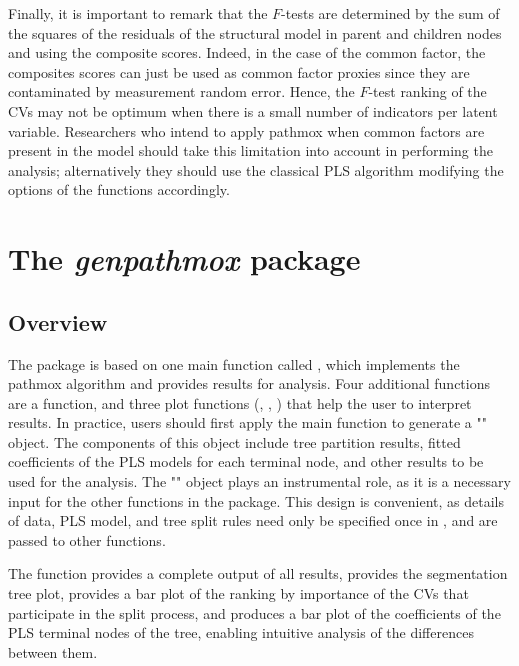 Finally, it is important to remark that the $F$-tests are determined by the sum of the squares of the residuals of the structural model in parent and children nodes and using the composite scores. Indeed, in the case of the common factor, the composites scores can just be used as common factor proxies since they are contaminated by measurement random error. Hence, the $F$-test ranking of the CVs may not be optimum when there is a small number of indicators per latent variable. Researchers who intend to apply pathmox when common factors are present in the model should take this limitation into account in performing the analysis; alternatively they should use the classical PLS algorithm modifying the options of the  functions accordingly.

\section{The \emph{genpathmox} package}

\subsection{Overview}

The  package is based on one main function called  , which implements the pathmox algorithm and provides results for analysis. Four additional functions are a   function, and three plot functions (,  ,  )  that help the user to interpret results. In practice, users should first apply the main function   to generate a  "" object.  The components of this object include tree partition results, fitted coefficients of the PLS models for each terminal node, and other results to be used for the analysis. The  "" object plays an instrumental role, as it is a necessary input for the other functions in the package. This design is convenient, as details of data, PLS model, and tree split rules need only be specified once in  , and are passed to other functions.

The   function provides a complete output of all results,   provides the segmentation tree plot,   provides a bar plot of the ranking by importance of the CVs that participate in the split process, and     produces a bar plot of the coefficients of the PLS terminal nodes of the tree, enabling intuitive analysis of the differences between them.


